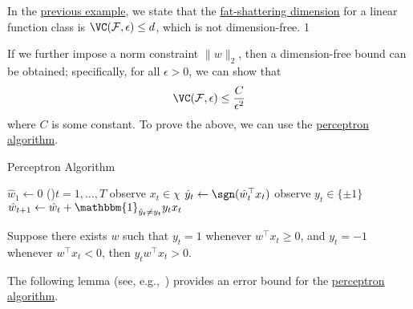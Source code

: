 \begin{prev}
	In the \hyperref[eg:lec16]{previous example}, we state that the \hyperref[def:fat-shattering-dimension]{fat-shattering dimension} for a linear function class is \(\VC(\mathcal{F}, \epsilon) \leq d\), which is not dimension-free.	1
\end{prev}

If we further impose a norm constraint \(\lVert w \rVert _2\), then a dimension-free bound can be obtained; specifically, for all \(\epsilon > 0\), we can show that
\[
	\VC(\mathcal{F}, \epsilon) \leq \frac{C}{\epsilon^2}
\]
where \(C\) is some constant. To prove the above, we can use the \hyperref[algo:perceptron]{perceptron algorithm}.

\begin{algorithm}[H]\label{algo:perceptron}
	\DontPrintSemicolon
	\caption{Perceptron Algorithm}
	\BlankLine

	\(\hat{w} _1\gets 0\)\;
	\For(){\(t = 1, \dots  , T\)}{
	observe \(x_t \in \chi \)
	\(\hat{y} _t \gets \sgn(\hat{w} _t ^{\top} x_t)\)
	observe \(y_t \in \{ \pm 1 \} \)
	\(\hat{w} _{t+1} \gets \hat{w} _t + \mathbbm{1}_{\hat{y} _t \neq y_t} y_t x_t\)\;
	}
	\;
\end{algorithm}

\begin{remark}
	Suppose there exists \(w\) such that \(y_t = 1\) whenever \(w^{\top} x_t \geq 0\), and \(y_t = -1\) whenever \(w^{\top} x_t < 0\), then \(y_t w^{\top} x_t > 0\).
\end{remark}

The following lemma (see, e.g.,~\cite{novikoff1962convergence}) provides an error bound for the \hyperref[algo:perceptron]{perceptron algorithm}.

